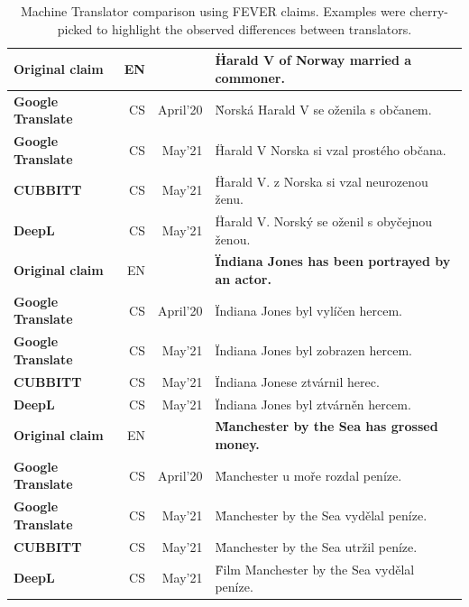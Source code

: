 \begin{table}[H]
\begin{ctucolortab}
\begin{tabular}{ l r r | l }

    
    \textbf{Original claim} &\footnotesize{EN}& ~ & \textbf{\"{Harald V of Norway married a commoner.}}\\
    \hline
    \textbf{\textsf{Google Translate}} &\footnotesize{CS}&\footnotesize{April'20}& \"{Norská Harald V se oženila s občanem.}\\
    \textbf{\textsf{Google Translate}} &\footnotesize{CS}&\footnotesize{May'21}& \"{Harald V Norska si vzal prostého občana.}\\
    \textbf{\textsf{CUBBITT}} &\footnotesize{CS}&\footnotesize{May'21} & \"{Harald V. z Norska si vzal neurozenou ženu.}\\
    \textbf{\textsf{DeepL}} &\footnotesize{CS}&\footnotesize{May'21} & \"{Harald V. Norský se oženil s obyčejnou ženou.}\\
    \hhline{===|=}
    \textbf{Original claim} &\footnotesize{EN}& ~ & \textbf{\"{Indiana Jones has been portrayed by an actor.}}\\
    \hline
    \textbf{\textsf{Google Translate}} &\footnotesize{CS}&\footnotesize{April'20}& \"{Indiana Jones byl vylíčen hercem.}\\
    \textbf{\textsf{Google Translate}} &\footnotesize{CS}&\footnotesize{May'21}& \"{Indiana Jones byl zobrazen hercem.}\\
    \textbf{\textsf{CUBBITT}} &\footnotesize{CS}&\footnotesize{May'21} & \"{Indiana Jonese ztvárnil herec.}\\
    \textbf{\textsf{DeepL}} &\footnotesize{CS}&\footnotesize{May'21} & \"{Indiana Jones byl ztvárněn hercem.}\\
    \hhline{===|=}
    \textbf{Original claim} &\footnotesize{EN}& ~ & \textbf{\"{Manchester by the Sea has grossed money.}}\\
    \hline
    \textbf{\textsf{Google Translate}} &\footnotesize{CS}&\footnotesize{April'20}& \"{Manchester u moře rozdal peníze.}\\
    \textbf{\textsf{Google Translate}} &\footnotesize{CS}&\footnotesize{May'21}& \"{Manchester by the Sea vydělal peníze.}\\
    \textbf{\textsf{CUBBITT}} &\footnotesize{CS}&\footnotesize{May'21} & \"{Manchester by the Sea utržil peníze.
}\\
    \textbf{\textsf{DeepL}} &\footnotesize{CS}&\footnotesize{May'21} & \"{Film Manchester by the Sea vydělal peníze.}\\
\end{tabular}
\end{ctucolortab}
\caption[Machine Translator comparison using \textsf{FEVER} claims]{Machine Translator comparison using \textsf{FEVER} claims. Examples were cherry-picked to highlight the observed differences between translators.}
    \label{fig:translators}
\end{table}

